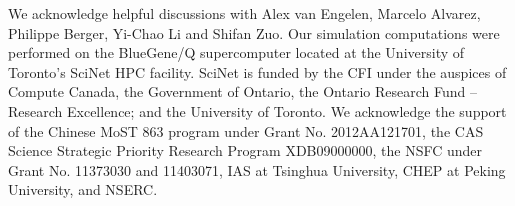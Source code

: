 \documentclass[aps,prl,twocolumn,showpacs,superscriptaddress,groupedaddress,nofootinbib]{revtex4}  %
\begin{document}
We acknowledge helpful discussions with Alex van Engelen, Marcelo Alvarez,
Philippe Berger, Yi-Chao Li and Shifan Zuo.
Our simulation computations were performed on the BlueGene/Q supercomputer 
located at the University of Toronto’s SciNet HPC facility.
SciNet is funded by the CFI under the auspices of Compute Canada, 
the Government of Ontario, the Ontario Research Fund – Research Excellence;
and the University of Toronto.
We acknowledge the support of the Chinese MoST 863 program under Grant 
No. 2012AA121701, the CAS Science Strategic Priority Research Program 
XDB09000000, the NSFC under Grant No. 11373030 and 11403071, IAS at 
Tsinghua University, CHEP at Peking University, and NSERC.



\end{document}
